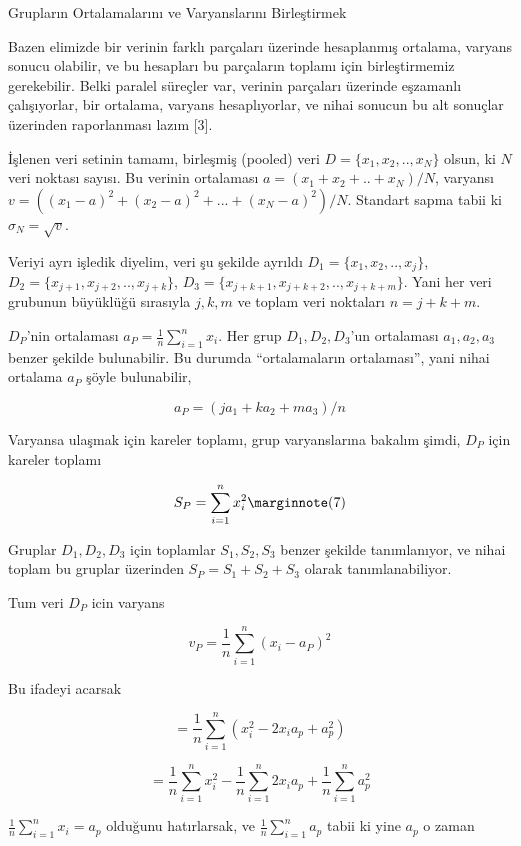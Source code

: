 \documentclass[12pt,fleqn]{article}\usepackage{../../common}
\begin{document}

Grupların Ortalamalarını ve Varyanslarını Birleştirmek

Bazen elimizde bir verinin farklı parçaları üzerinde hesaplanmış ortalama,
varyans sonucu olabilir, ve bu hesapları bu parçaların toplamı için
birleştirmemiz gerekebilir. Belki paralel süreçler var, verinin parçaları
üzerinde eşzamanlı çalışıyorlar, bir ortalama, varyans hesaplıyorlar,
ve nihai sonucun bu alt sonuçlar üzerinden raporlanması lazım [3].

İşlenen veri setinin tamamı, birleşmiş (pooled) veri $D = \{ x_1, x_2,.., x_N\}$ 
olsun, ki $N$ veri noktası sayısı. Bu verinin ortalaması $a = (x_1 + x_2 + .. + x_N) / N$, 
varyansı $v = ((x_1 - a)^2 + (x_2 - a)^2 + ... + (x_N - a)^2 ) / N$.  
Standart sapma tabii ki $\sigma_N = \sqrt{v}$.

Veriyi ayrı işledik diyelim, veri şu şekilde ayrıldı $D_1 = \{ x_1, x_2,..,x_j\}$,
$D_2 = \{ x_{j+1}, x_{j+2},..,x_{j+k}\}$, $D_3 = \{ x_{j+k+1}, x_{j+k+2},..,x_{j+k+m}\}$.
Yani her veri grubunun büyüklüğü sırasıyla $j,k,m$ ve toplam veri noktaları
$n = j+k+m$.

$D_P$'nin ortalaması $a_P = \frac{1}{n} \sum _{i=1}^{n} x_i$. Her grup $D_1,D_2,D_3$'un
ortalaması $a_1,a_2,a_3$ benzer şekilde bulunabilir. Bu durumda ``ortalamaların
ortalaması'', yani nihai ortalama $a_P$ şöyle bulunabilir,

$$
a_P = (j a_1 + k a_2 + m a_3 ) / n
$$

Varyansa ulaşmak için kareler toplamı, grup varyanslarına bakalım şimdi, $D_P$
için kareler toplamı

$$
S_P = \sum _{i=1}^{n} x_i^2
\mlabel{7}
$$

Gruplar $D_1,D_2,D_3$ için toplamlar $S_1,S_2,S_3$ benzer şekilde tanımlanıyor,
ve nihai toplam bu gruplar üzerinden $S_P = S_1 + S_2 + S_3$ olarak
tanımlanabiliyor.

Tum veri $D_P$ icin varyans

$$
v_P = \frac{1}{n} \sum_{i=1}^{n} (x_i - a_P)^2
$$

Bu ifadeyi acarsak

$$
= \frac{1}{n} \sum_{i=1}^{n} ( x_i^2 - 2 x_i a_p + a_p^2 )
$$

$$
= \frac{1}{n} \sum_{i=1}^{n}  x_i^2  - \frac{1}{n} \sum_{i=1}^{n}  2 x_i a_p + \frac{1}{n} \sum_{i=1}^{n} a_p^2
$$

$\frac{1}{n} \sum_{i=1}^{n} x_i = a_p$ olduğunu hatırlarsak, ve $\frac{1}{n} \sum_{i=1}^{n} a_p$
tabii ki yine $a_p$ o zaman 
\end{document}

